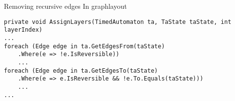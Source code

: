 \begin{frame}[fragile]{Removing recursive edges}
    In graphlayout
    \begin{lstlisting}[style=csharp,basicstyle=\tiny]
private void AssignLayers(TimedAutomaton ta, TaState taState, int layerIndex)
...
foreach (Edge edge in ta.GetEdgesFrom(taState)
    .Where(e => !e.IsReversible))
    ...
foreach (Edge edge in ta.GetEdgesTo(taState)
    .Where(e => e.IsReversible && !e.To.Equals(taState)))
    ...
...
    \end{lstlisting}
\end{frame}